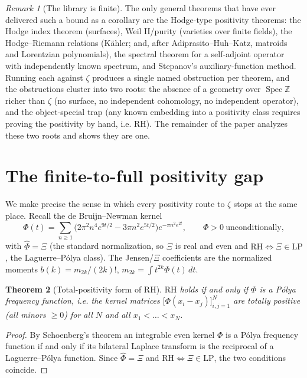 \documentclass[11pt]{amsart}
\newtheorem{theorem}{Theorem}[section]
\theoremstyle{definition}
\theoremstyle{remark}
\newtheorem{remark}[theorem]{Remark}
\newcommand{\bbZ}{\mathbb{Z}}
\newcommand{\Xib}{\Xi}
\newcommand{\LP}{\mathrm{LP}}
\newcommand{\RH}{\mathrm{RH}}
\begin{document}
\begin{remark}[The library is finite]
The only general theorems that have ever delivered such a bound as a corollary
are the Hodge-type positivity theorems: the Hodge index theorem (surfaces),
Weil II/purity (varieties over finite fields), the Hodge--Riemann relations
(K\"ahler; and, after Adiprasito--Huh--Katz, matroids and Lorentzian
polynomials), the spectral theorem for a self-adjoint operator with
independently known spectrum, and Stepanov's auxiliary-function method. Running
each against $\zeta$ produces a single named obstruction per theorem, and the
obstructions cluster into two roots: the absence of a geometry over
$\operatorname{Spec}\bbZ$ richer than $\zeta$ (no surface, no independent
cohomology, no independent operator), and the object-special trap (any known
embedding into a positivity class requires proving the positivity by hand, i.e.
RH). The remainder of the paper analyzes these two roots and shows they are one.
\end{remark}

\section{The finite-to-full positivity gap}\label{sec:gap}

We make precise the sense in which every positivity route to $\zeta$ stops at
the same place. Recall the de Bruijn--Newman kernel
\[
\Phi(t)=\sum_{n\ge1}\bigl(2\pi^2 n^4 e^{9t/2}-3\pi n^2 e^{5t/2}\bigr)
e^{-\pi n^2 e^{2t}},\qquad \Phi>0\ \text{unconditionally},
\]
with $\widehat\Phi=\Xib$ (the standard normalization, so $\Xib$ is real and
even and $\RH\iff\Xib\in\LP$, the Laguerre--P\'olya class). The Jensen/$\Xib$
coefficients are the normalized moments $b(k)=m_{2k}/(2k)!$,
$m_{2k}=\int t^{2k}\Phi(t)\,dt$.

\begin{theorem}[Total-positivity form of RH]\label{thm:tp}
$\RH$ holds if and only if $\Phi$ is a P\'olya frequency function, i.e. the
kernel matrices $\bigl[\Phi(x_i-x_j)\bigr]_{i,j=1}^N$ are totally positive
(all minors $\ge0$) for all $N$ and all $x_1<\dots<x_N$.
\end{theorem}
\begin{proof}
By Schoenberg's theorem an integrable even kernel $\Phi$ is a P\'olya frequency
function if and only if its bilateral Laplace transform is the reciprocal of a
Laguerre--P\'olya function. Since $\widehat\Phi=\Xib$ and
$\RH\iff\Xib\in\LP$, the two conditions coincide.
\end{proof}
\end{document}
